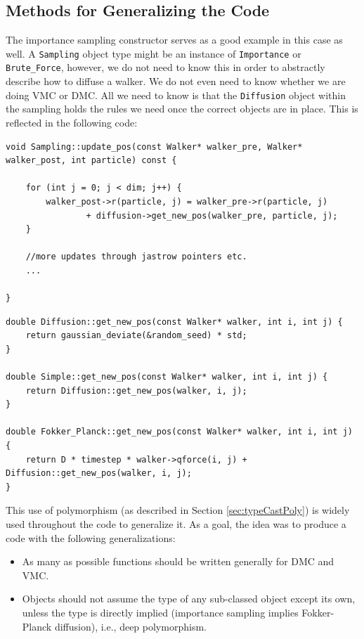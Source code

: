 \subsection{Methods for Generalizing the Code}

The importance sampling constructor serves as a good example in this case as well. A \verb+Sampling+ object type might be an instance of \verb+Importance+ or \verb+Brute_Force+, however, we do not need to know this in order to abstractly describe how to diffuse a walker. We do not even need to know whether we are doing VMC or DMC. All we need to know is that the \verb+Diffusion+ object within the sampling holds the rules we need once the correct objects are in place. This is reflected in the following code:

\vspace{0.5cm}
\begin{lstlisting}
void Sampling::update_pos(const Walker* walker_pre, Walker* walker_post, int particle) const {

    for (int j = 0; j < dim; j++) {
        walker_post->r(particle, j) = walker_pre->r(particle, j)
                + diffusion->get_new_pos(walker_pre, particle, j);
    }

    //more updates through jastrow pointers etc.
    ...

}
\end{lstlisting}

\begin{lstlisting}
double Diffusion::get_new_pos(const Walker* walker, int i, int j) {
    return gaussian_deviate(&random_seed) * std;
}

double Simple::get_new_pos(const Walker* walker, int i, int j) {
    return Diffusion::get_new_pos(walker, i, j);
}

double Fokker_Planck::get_new_pos(const Walker* walker, int i, int j) {
    return D * timestep * walker->qforce(i, j) + Diffusion::get_new_pos(walker, i, j);
}
\end{lstlisting}

This use of polymorphism (as described in Section \ref{sec:typeCastPoly}) is widely used throughout the code to generalize it. As a goal, the idea was to produce a code with the following generalizations:

\begin{itemize}
 \item As many as possible functions should be written generally for DMC and VMC.
 \item Objects should not assume the type of any sub-classed object except its own, unless the type is directly implied (importance sampling implies Fokker-Planck diffusion), i.e., deep polymorphism.
\end{itemize}

